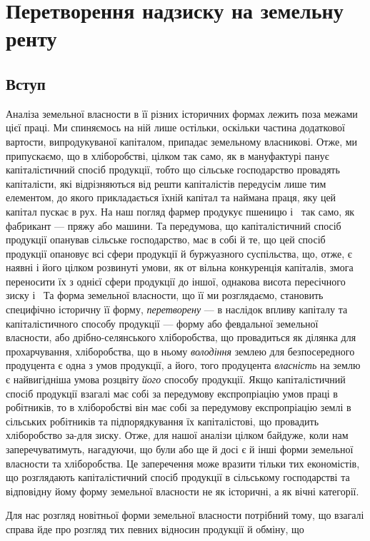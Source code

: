 
\chapter{Перетворення надзиску на земельну ренту}

\section{Вступ}

Аналіза земельної власности в її різних історичних формах лежить поза
межами цієї праці. Ми спиняємось на ній лише остільки, оскільки частина додаткової
вартости, випродукуваної капіталом, припадає земельному власникові.
Отже, ми припускаємо, що в хліборобстві, цілком так само, як в мануфактурі
панує капіталістичний спосіб продукції, тобто що сільське господарство провадять
капіталісти, які відрізняються від решти капіталістів передусім лише тим
елементом, до якого прикладається їхній капітал та наймана праця, яку цей
капітал пускає в рух. На наш погляд фармер продукує пшеницю і~ так
само, як фабрикант — пряжу або машини. Та передумова, що капіталістичний спосіб
продукції опанував сільське господарство, має в собі й те, що цей спосіб продукції
опановує всі сфери продукції й буржуазного суспільства, що, отже,
є наявні і його цілком розвинуті умови, як от вільна конкуренція капіталів,
змога переносити їх з однієї сфери продукції до іншої, однакова висота пересічного
зиску і~ Та форма земельної власности, що її ми розглядаємо,
становить специфічно історичну її форму, \emph{перетворену} — в наслідок впливу
капіталу та капіталістичного способу продукції — форму або февдальної земельної
власности, або дрібно-селянського хліборобства, що провадиться як ділянка
для прохарчування, хліборобства, що в ньому \emph{володіння} землею для безпосередного
продуцента є одна з умов продукції, а його, того продуцента \emph{власність}
на землю є найвигідніша умова розцвіту \emph{його} способу продукції. Якщо
капіталістичний спосіб продукції взагалі має собі за передумову експропріацію
умов праці в робітників, то в хліборобстві він має собі за передумову
експропріацію землі в сільських робітників та підпорядкування їх капіталістові,
що провадить хліборобство за-для зиску. Отже, для нашої аналізи цілком байдуже,
коли нам заперечуватимуть, нагадуючи, що були або ще й досі є й інші
форми земельної власности та хліборобства. Це заперечення може вразити тільки
тих економістів, що розглядають капіталістичний спосіб продукції в сільському
господарстві та відповідну йому форму земельної власности не як історичні, а як
вічні категорії.

Для нас розгляд новітньої форми земельної власности потрібний тому, що
взагалі справа йде про розгляд тих певних відносин продукції й обміну, що
\parbreak{}  %
